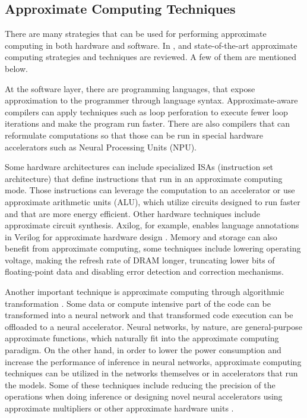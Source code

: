 \subsection{Approximate Computing Techniques}

There are many strategies that can be used for performing approximate computing in both hardware and software. In \cite{Xu2016}, \cite{Mittal2016} and \cite{Han2013} state-of-the-art approximate computing strategies and techniques are reviewed. A few of them are mentioned below.

At the software layer, there are programming languages, that expose approximation to the programmer through language syntax. Approximate-aware compilers can apply techniques such as loop perforation to execute fewer loop iterations and make the program run faster. There are also compilers that can reformulate computations so that those can be run in special hardware accelerators such as Neural Processing Units (NPU).

Some hardware architectures can include specialized ISAs (instruction set architecture) that define instructions that run in an approximate computing mode. Those instructions can leverage the computation to an accelerator or use approximate arithmetic units (ALU), which utilize circuits designed to run faster and that are more energy efficient. Other hardware techniques include approximate circuit synthesis. Axilog, for example, enables language annotations in Verilog for approximate hardware design \cite{Yazdanbakhsh2015}. Memory and storage can also benefit from approximate computing, some techniques include lowering operating voltage, making the refresh rate of DRAM longer, truncating lower bits of floating-point data and disabling error detection and correction mechanisms.

Another important technique is approximate computing through algorithmic transformation \cite{Esmaeilzadeh2012}. Some data or compute intensive part of the code can be transformed into a neural network and that transformed code execution can be offloaded to a neural accelerator. Neural networks, by nature, are general-purpose approximate functions, which naturally fit into the approximate computing paradigm. On the other hand, in order to lower the power consumption and increase the performance of inference in neural networks, approximate computing techniques can be utilized in the networks themselves or in accelerators that run the models. Some of these techniques include reducing the precision of the operations when doing inference \cite{Hanif2018} or designing novel neural accelerators using approximate multipliers or other approximate hardware units \cite{Cheng2019}.

